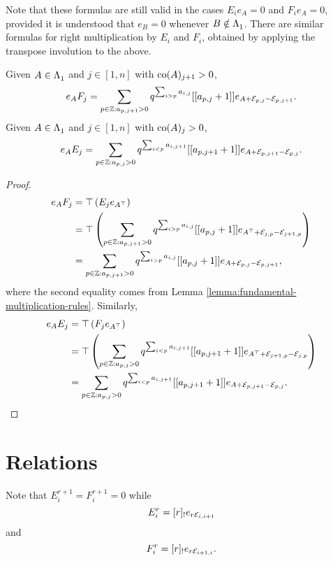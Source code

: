 \documentclass[a4paper, 11pt]{report}
\begin{document}
Note that these formulas are still valid in the cases $E_ie_A=0$ and $F_ie_A=0$, provided it is understood that $e_B = 0$ whenever $B\notin\Lambda_1^{}$. There are similar formulas for right multiplication by $E_i$ and $F_i$, obtained by applying the transpose involution to the above.

\begin{corollary}\label{corollary:fundamental-right-multiplication-rules}
Given $A\in\Lambda_1^{}$ and $j\in[1,n]$ with $\operatorname{co}(A)_{j+1}>0$,
\begin{equation*}
e_AF_j = \sum_{p\in\mathbb{Z}: a_{p,j+1}>0} q^{\sum_{i>p}a_{i,j}} [[a_{p,j}+1]] e_{A+\mathcal{E}_{p,j}-\mathcal{E}_{p,j+1}}.
\end{equation*}
Given $A\in\Lambda_1^{}$ and $j\in[1,n]$ with $\operatorname{co}(A)_{j}>0$,
\begin{equation*}
e_AE_j = \sum_{p\in\mathbb{Z}: a_{p,j}>0} q^{\sum_{i<p} a_{i,j+1}} [[a_{p,j+1}+1]] e_{A+\mathcal{E}_{p,j+1}-\mathcal{E}_{p,j}}.
\end{equation*}
\end{corollary}

\begin{proof}
\begin{align*}
e_AF_j
&= \top\left(E_j e_{A^\top}\right)\\
&= \top\left(\sum_{p\in\mathbb{Z}: a_{p,j+1}>0} q^{\sum_{i>p} a_{i,j}} [[a_{p,j}+1]] e_{A^\top +\mathcal{E}_{j,p} -\mathcal{E}_{j+1,p}}\right)\\
&= \sum_{p\in\mathbb{Z}: a_{p,j+1}>0} q^{\sum_{i>p}a_{i,j}} [[a_{p,j}+1]] e_{A+\mathcal{E}_{p,j}-\mathcal{E}_{p,j+1}},
\end{align*}
where the second equality comes from Lemma \ref{lemma:fundamental-multiplication-rules}. Similarly,
\begin{align*}
e_AE_j
&= \top\left(F_j e_{A^\top}\right)\\
&= \top\left( \sum_{p\in\mathbb{Z}:a_{p,j}>0} q^{\sum_{i<p} a_{i,j+1}} [[a_{p,j+1}+1]] e_{A^\top +\mathcal{E}_{j+1,p} - \mathcal{E}_{j,p}}\right)\\
&= \sum_{p\in\mathbb{Z}: a_{p,j}>0} q^{\sum_{i<p}a_{i,j+1}} [[a_{p,j+1}+1]] e_{A+\mathcal{E}_{p,j+1} -\mathcal{E}_{p,j}}.
\end{align*}
\end{proof}

\section{Relations}

Note that $E_i^{r+1}=F_i^{r+1}=0$ while
\begin{equation*}
E_i^r = [r]_! e_{r\mathcal{E}_{i,i+1}}
\end{equation*}
and
\begin{equation*}
F_i^r = [r]_! e_{r\mathcal{E}_{i+1,i}}.
\end{equation*}
\end{document}
